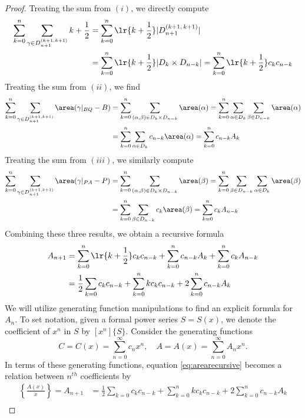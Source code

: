 \documentclass[12pt]{article}
\begin{document}
\begin{proof}
  \noindent Treating the sum from $ (i) $, we directly compute
  \begin{align*}
    \sum_{k=0}^{n} \sum_{\gamma\in D_{n+1}^{(k+1,k+1)}}  k+\frac{1}{2} &= \sum_{k=0}^{n} \lr{k+\frac{1}{2}} |D_{n+1}^{(k+1,\,k+1)}| \\
    &= \sum_{k=0}^{n} \lr{k+\frac{1}{2}} |D_{k}\times D_{n-k}| = \sum_{k=0}^{n}\lr{k+\frac{1}{2}} c_{k}c_{n-k}\\
  \end{align*}
  Treating the sum from $ (ii) $, we find
  \begin{align*}
    \sum_{k=0}^{n} \sum_{\gamma\in D_{n+1}^{(k+1,k+1)}}\area(\gamma\vert_{BQ} - B) &= \sum_{k=0}^{n} \sum_{(\alpha,\beta)\in D_{k}\times D_{n-k}}\area(\alpha) = \sum_{k=0}^{n} \sum_{\alpha\in D_{k}} \sum_{\beta\in D_{n-k}}\area(\alpha) \\
    &= \sum_{k=0}^{n}\sum_{\alpha\in D_{k}} c_{n-k}\area(\alpha) = \sum_{k=0}^{n} c_{n-k} A_{k}
  \end{align*}
  Treating the sum from $ (iii) $, we similarly compute
  \begin{align*}
    \sum_{k=0}^{n} \sum_{\gamma\in D_{n+1}^{(k+1,k+1)}}\area(\gamma\vert_{PA} - P) &= \sum_{k=0}^{n} \sum_{(\alpha,\beta)\in D_{k}\times D_{n-k}}\area(\beta) = \sum_{k=0}^{n}\sum_{\beta\in D_{n-k}} \sum_{\alpha\in D_{k}} \area(\beta) \\
    &= \sum_{k=0}^{n}\sum_{\beta\in D_{n-k}} c_{k}\area(\beta) = \sum_{k=0}^{n} c_{k} A_{n-k}
  \end{align*}
  Combining these three results, we obtain a recursive formula
  \begin{align}\label{eq:arearecursive}
    A_{n+1} &= \sum_{k=0}^{n} \lr{k+\frac{1}{2}} c_{k}c_{n-k} + \sum_{k=0}^{n} c_{n-k}A_{k} + \sum_{k=0}^{n} c_{k}A_{n-k}\nonumber \\
    &= \frac{1}{2}\sum_{k=0}c_{k}c_{n-k} + \sum_{k=0}^{n}kc_{k}c_{n-k} + 2\sum_{k=0}^{n} c_{n-k}A_{k}
  \end{align} 
  We will utilize generating function manipulations to find an explicit formula for $ A_{n} $. To set notation, given a formal power series $ S=S(x) $, we denote the coefficient of $ x^n $ in $S$ by $ [x^{n}]\{S\}$. Consider the generating functions 
  \[
    C = C(x) = \sum_{n=0}^{\infty} c_{n}x^{n}, \quad A=A(x) = \sum_{n=0}^{\infty} A_{n}x^{n}.
  \]
  In terms of these generating functions, equation \eqref{eq:arearecursive} becomes a relation between $ n^{th} $ coefficients by
  \begin{align*}
    [x^{n}]\left\{\frac{A(x)}{x}\right\} = A_{n+1} &= \frac{1}{2}\sum_{k=0}c_{k}c_{n-k} + \sum_{k=0}^{n}kc_{k}c_{n-k} + 2\sum_{k=0}^{n} c_{n-k}A_{k}\\

\end{align*}
\end{proof}
\end{document}
